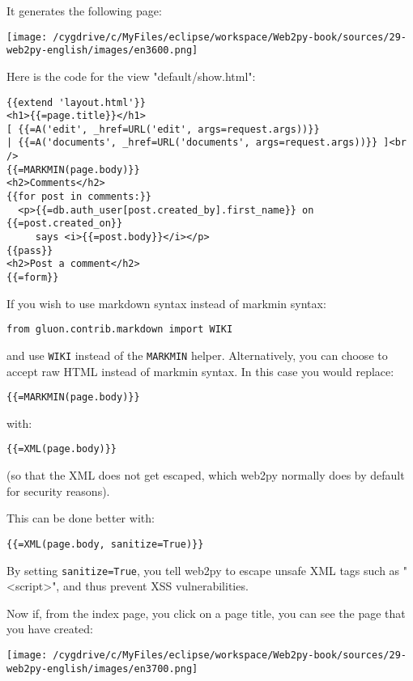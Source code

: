 \documentclass[justified,sixbynine,notoc]{tufte-book}
\def\ft{\small\tt}
\def\inxx#1{\index{#1}}
\begin{document}
\begin{fullwidth}
It generates the following page:


\goodbreak\begin{center}\texttt{[image: /cygdrive/c/MyFiles/eclipse/workspace/Web2py-book/sources/29-web2py-english/images/en3600.png]}\end{center}


Here is the code for the view "default/show.html":

\inxx{markdown} \inxx{MARKMIN}
\begin{lstlisting}[keywords={}]
{{extend 'layout.html'}}
<h1>{{=page.title}}</h1>
[ {{=A('edit', _href=URL('edit', args=request.args))}}
| {{=A('documents', _href=URL('documents', args=request.args))}} ]<br />
{{=MARKMIN(page.body)}}
<h2>Comments</h2>
{{for post in comments:}}
  <p>{{=db.auth_user[post.created_by].first_name}} on {{=post.created_on}}
     says <i>{{=post.body}}</i></p>
{{pass}}
<h2>Post a comment</h2>
{{=form}}
\end{lstlisting}

If you wish to use markdown syntax instead of markmin syntax:

\begin{lstlisting}
from gluon.contrib.markdown import WIKI
\end{lstlisting}
\noindent and use {\ft WIKI} instead of the {\ft MARKMIN} helper.
Alternatively, you can choose to accept raw HTML instead of markmin syntax. In this case you would replace:
\begin{lstlisting}[keywords={}]
{{=MARKMIN(page.body)}}
\end{lstlisting}
\noindent with:
\begin{lstlisting}[keywords={}]
{{=XML(page.body)}}
\end{lstlisting}

\inxx{sanitize}
(so that the XML does not get escaped, which web2py normally does by default for security reasons).

This can be done better with:
\begin{lstlisting}[keywords={}]
{{=XML(page.body, sanitize=True)}}
\end{lstlisting}

By setting {\ft sanitize=True}, you tell web2py to escape unsafe XML tags such as "<script>", and thus prevent XSS vulnerabilities.

Now if, from the index page, you click on a page title, you can see the page that you have created:


\goodbreak\begin{center}\texttt{[image: /cygdrive/c/MyFiles/eclipse/workspace/Web2py-book/sources/29-web2py-english/images/en3700.png]}\end{center}



\end{fullwidth}
\end{document}
